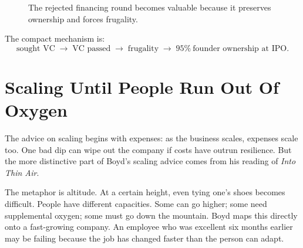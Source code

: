 \begin{figure}
\centering
{}
\caption{The rejected financing round becomes valuable because it preserves ownership and forces frugality.}
\end{figure}

The compact mechanism is:
\begin{equation}
\text{sought VC}
\;\longrightarrow\;
\text{VC passed}
\;\longrightarrow\;
\text{frugality}
\;\longrightarrow\;
95\%\ \text{founder ownership at IPO}.
\end{equation}

\section{Scaling Until People Run Out Of Oxygen}

The advice on scaling begins with expenses: as the business scales, expenses scale too. One bad dip can wipe out the company if costs have outrun resilience. But the more distinctive part of Boyd's scaling advice comes from his reading of \emph{Into Thin Air}.

The metaphor is altitude. At a certain height, even tying one's shoes becomes difficult. People have different capacities. Some can go higher; some need supplemental oxygen; some must go down the mountain. Boyd maps this directly onto a fast-growing company. An employee who was excellent six months earlier may be failing because the job has changed faster than the person can adapt.

